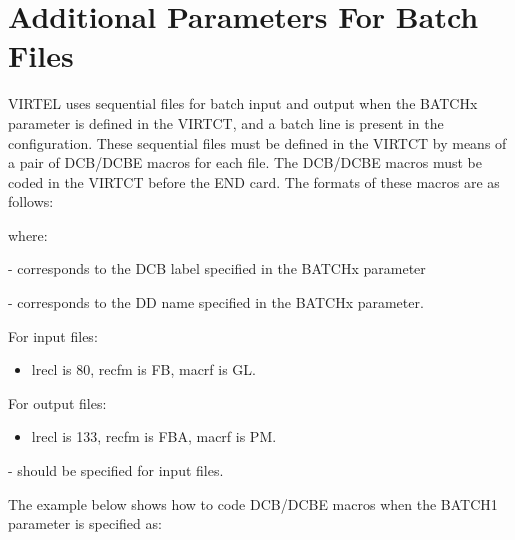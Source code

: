 \documentclass[letterpaper,10pt,english]{sphinxmanual}
\begin{document}
\section{Additional Parameters For Batch Files}
\label{\detokenize{Installation_Guide:additional-parameters-for-batch-files}}
VIRTEL uses sequential files for batch input and output when the BATCHx parameter is defined in the VIRTCT, and a batch line is present in the configuration. These sequential files must be defined in the VIRTCT by means of a pair of DCB/DCBE macros for each file. The DCB/DCBE macros must be coded in the VIRTCT before the END card. The formats of these macros are as follows:

\begin{sphinxVerbatim}[commandchars=\\\{\}]
                             
  
\end{sphinxVerbatim}

where:

 - corresponds to the DCB label specified in the BATCHx parameter

 - corresponds to the DD name specified in the BATCHx parameter.

For input files:
\begin{itemize}
\item {} 
lrecl is 80, recfm is FB, macrf is GL.

\end{itemize}

For output files:
\begin{itemize}
\item {} 
lrecl is 133, recfm is FBA, macrf is PM.

\end{itemize}

 - should be specified for input files.

The example below shows how to code DCB/DCBE macros when the BATCH1 parameter is specified as:
\end{document}
